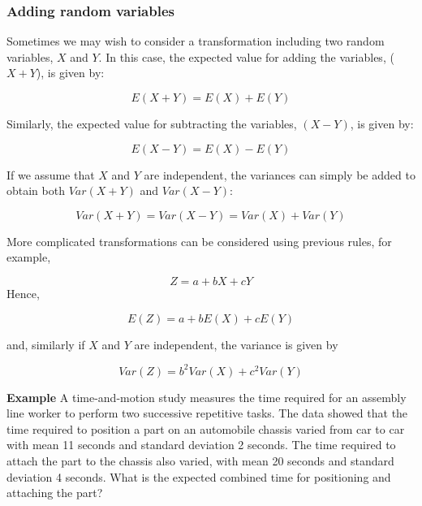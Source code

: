 \documentclass[
  oneside]{krantz}
\begin{document}
\hypertarget{adding-random-variables}{%
\subsubsection{Adding random variables}\label{adding-random-variables}}

Sometimes we may wish to consider a transformation including two random variables, \(X\) and \(Y\). In this case, the expected value for adding the variables, (\(X + Y\)), is given by:

\begin{equation}
E(X + Y) = E(X) + E(Y)
\end{equation}

Similarly, the expected value for subtracting the variables, \((X-Y)\), is given by:

\begin{equation}
E(X - Y) = E(X) - E(Y)
\end{equation}

If we assume that \(X\) and \(Y\) are independent, the variances can simply be added to obtain both \(Var(X+Y)\) and \(Var(X-Y)\):

\begin{equation}
Var(X+Y) = Var(X-Y) = Var(X) + Var(Y)
\end{equation}

More complicated transformations can be considered using previous rules, for example,

\[Z = a + bX + cY\]
Hence,

\begin{equation}
E(Z) = a + bE(X) + cE(Y)
\label{rvtransexp}
\end{equation}

and, similarly if \(X\) and \(Y\) are independent, the variance is given by

\begin{equation}
Var(Z) = b^2Var(X) + c^2Var(Y)
\end{equation}

\textbf{Example} A time-and-motion study measures the time required for an assembly line worker to perform two successive repetitive tasks. The data showed that the time required to position a part on an automobile chassis varied from car to car with mean 11 seconds and standard deviation 2 seconds. The time required to attach the part to the chassis also varied, with mean 20 seconds and standard deviation 4 seconds. What is the expected combined time for positioning and attaching the part?
\end{document}
